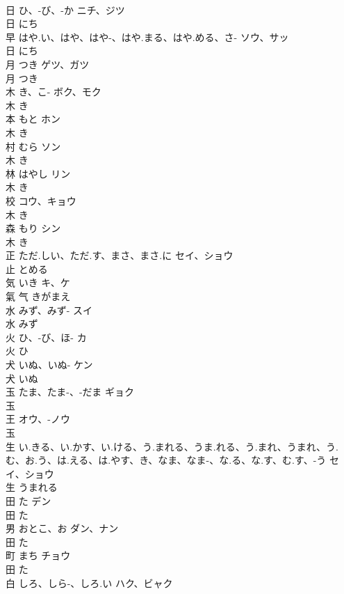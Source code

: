 \documentclass[8pt]{extreport}
\begin{document}
\begin{CJK}{UTF8}{min}
\\	日	ひ、-び、-か	ニチ、ジツ	
\\	日		にち		
\\	早	はや.い、はや、はや-、はや.まる、はや.める、さ-	ソウ、サッ	
\\	日		にち		
\\	月	つき	ゲツ、ガツ	
\\	月		つき		
\\	木	き、こ-	ボク、モク	
\\	木		き		
\\	本	もと	ホン	
\\	木		き		
\\	村	むら	ソン	
\\	木		き		
\\	林	はやし	リン	
\\	木		き		
\\	校		コウ、キョウ	
\\	木		き		
\\	森	もり	シン	
\\	木		き		
\\	正	ただ.しい、ただ.す、まさ、まさ.に	セイ、ショウ	
\\	止		とめる		
\\	気	いき	キ、ケ	
\\	氣	气		きがまえ		
\\	水	みず、みず-	スイ	
\\	水		みず		
\\	火	ひ、-び、ほ-	カ	
\\	火		ひ		
\\	犬	いぬ、いぬ-	ケン	
\\	犬		いぬ		
\\	玉	たま、たま-、-だま	ギョク	
\\	玉				
\\	王		オウ、-ノウ	
\\	玉				
\\	生	い.きる、い.かす、い.ける、う.まれる、うま.れる、う.まれ、うまれ、う.む、お.う、は.える、は.やす、き、なま、なま-、な.る、な.す、む.す、-う	セイ、ショウ	
\\	生		うまれる		
\\	田	た	デン	
\\	田		た		
\\	男	おとこ、お	ダン、ナン	
\\	田		た		
\\	町	まち	チョウ	
\\	田		た		
\\	白	しろ、しら-、しろ.い	ハク、ビャク	

\end{CJK}
\end{document}
